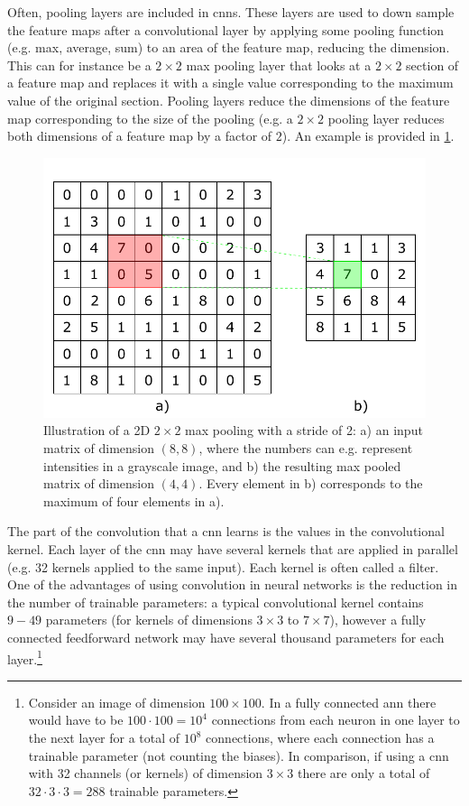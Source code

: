 Often, pooling layers are included in \gls{cnn}s. These layers are used to down sample the feature maps after a convolutional layer by applying some pooling function (e.g. max, average, sum) to an area of the feature map, reducing the dimension. This can for instance be a $2\times2$ max pooling layer that looks at a $2\times2$ section of a feature map and replaces it with a single value corresponding to the maximum value of the original section. Pooling layers reduce the dimensions of the feature map corresponding to the size of the pooling (e.g. a $2\times2$ pooling layer reduces both dimensions of a feature map by a factor of $2$). An example is provided in \cref{fig:maxpool}. 

\begin{figure}[htbp]  
    \centering
    \includegraphics[width=.7\textwidth]{figures/maxpool.pdf}
    \caption[Illustration of a max pooling operation]{Illustration of a 2D $2\times2$ max pooling with a stride of 2: a) an input matrix of dimension $(8,8)$, where the numbers can e.g. represent intensities in a grayscale image, and b) the resulting max pooled matrix of dimension $(4,4)$. Every element in b) corresponds to the maximum of four elements in a). }
    \label{fig:maxpool}
\end{figure}

The part of the convolution that a \gls{cnn} learns is the values in the convolutional kernel. Each layer of the \gls{cnn} may have several kernels that are applied in parallel (e.g. 32 kernels applied to the same input). Each kernel is often called a filter. One of the advantages of using convolution in neural networks is the reduction in the number of trainable parameters: a typical convolutional kernel contains $9-49$ parameters (for kernels of dimensions $3\times3$ to $7\times7$), however a fully connected feedforward network may have several thousand parameters for each layer.\footnote{Consider an image of dimension $100\times100$. In a fully connected \gls{ann} there would have to be $100 \cdot 100 = 10^4$ connections from each neuron in one layer to the next layer for a total of $10^{8}$ connections, where each connection has a trainable parameter (not counting the biases). In comparison, if using a \gls{cnn} with 32 channels (or kernels) of dimension $3\times3$ there are only a total of $32 \cdot 3 \cdot 3 = 288$ trainable parameters. } 

